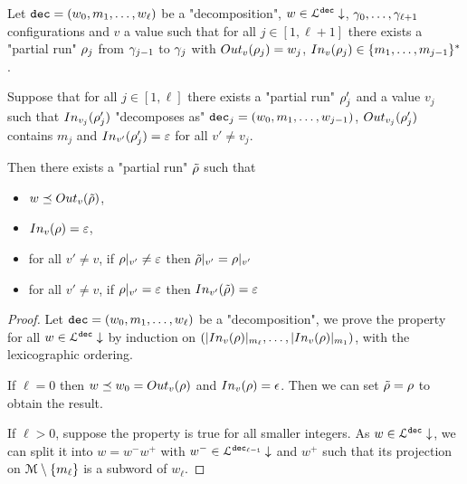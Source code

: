 \begin{lemma}
	Let $\mathtt{dec} = (w_0, m_1, \ldots, w_\ell)$ be a "decomposition", $w \in \mathcal{L}^{\mathtt{\mathtt{dec}}}\downarrow$, $\gamma_0, \ldots, \gamma_{\ell+1}$ configurations and $v$ a value such that for all $j \in [1,\ell+1]$ there exists a "partial run" $\rho_j$ from $\gamma_{j-1}$ to $\gamma_{j}$ with $\voutput{v}{\run_j} = w_j$, $\vinput{v}{\run_j} \in \set{m_1,\ldots, m_{j-1}}^*$.
	
	Suppose that for all $j \in [1,\ell]$ there exists a "partial run" $\rho'_j$ and a value $v_j$ such that $\vinput{v_j}{\run'_j}$ "decomposes as" $\mathtt{dec}_j = (w_0, m_1, \ldots, w_{j-1})$, $\voutput{v_j}{\run'_j}$ contains $m_j$ and $\vinput{v'}{\run'_j} = \varepsilon$ for all $v' \neq v_j$.
	
	Then there exists a "partial run" $\Tilde{\rho}$ such that 
	\begin{itemize}
		\item $w \subword \voutput{v}{\Tilde{\run}}$, 
		
		\item $\vinput{v}{\run} = \varepsilon$,
		
		\item for all $v' \neq v$, if ${\rho}|_{v'} \neq \varepsilon$ then ${\Tilde{\rho}}|_{v'} = {\rho}|_{v'}$
		
		\item for all $v' \neq v$, if ${\rho}|_{v'} = \varepsilon$ then $\vinput{v'}{\Tilde{\run}} = \varepsilon$
\end{itemize}
\end{lemma}


\begin{proof}
	Let $\mathtt{dec} = (w_0, m_1, \ldots, w_\ell)$ be a "decomposition", we prove the property for all $w \in \mathcal{L}^{\mathtt{\mathtt{dec}}}\downarrow$ by induction on $(\size{\vinput{v}{\run}}_{m_\ell}, \ldots, \size{\vinput{v}{\run}}_{m_1})$, with the lexicographic ordering.
	
	If $\ell = 0$ then $w \subword w_0 = \voutput{v}{\run}$ and $\vinput{v}{\run} = \epsilon$. Then we can set $\Tilde{\rho} = \rho$ to obtain the result.
	
	If $\ell>0$, suppose the property is true for all smaller integers.
	As $w \in \mathcal{L}^{\mathtt{\mathtt{dec}}}\downarrow$, we can split it into $w = w^- w^+$ with $w^- \in \mathcal{L}^{\mathtt{\mathtt{dec}_{\ell-1}}}\downarrow$ and $w^+$ such that its projection on $\mathcal{M} \setminus \{m_\ell\}$ is a subword of $w_\ell$. 
\end{proof}

